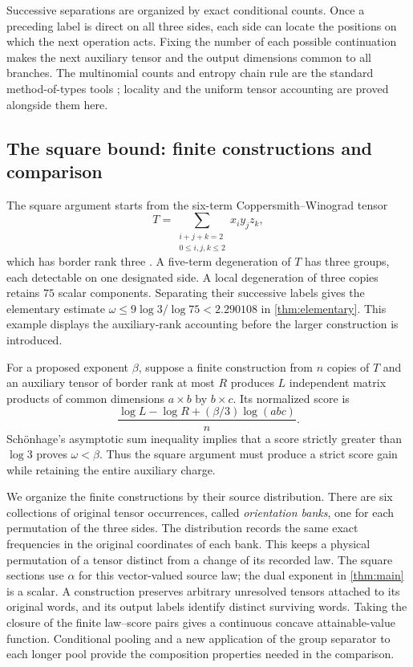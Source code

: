\documentclass[11pt]{article}
\numberwithin{equation}{section}
\theoremstyle{definition}
\theoremstyle{remark}
\begin{document}
Successive separations are organized by exact conditional counts.
Once a preceding label is direct on all three sides, each side can
locate the positions on which the next operation acts.  Fixing the
number of each possible continuation makes the next auxiliary tensor
and the output dimensions common to all branches.  The multinomial
counts and entropy chain rule are the standard method-of-types
tools \cite{shannon1948,csiszar1998}; locality and the uniform tensor
accounting are proved alongside them here.

\subsection{The square bound: finite constructions and comparison}

The square argument starts from the six-term Coppersmith--Winograd
tensor
\[
 T=\sum_{\substack{i+j+k=2\\0\le i,j,k\le2}}x_i y_j z_k,
\]
which has border rank three \cite[Section~7, equation~(10)]{cw}.
A five-term degeneration of \(T\) has three groups, each detectable
on one designated side.  A local degeneration of three copies retains
\(75\) scalar components.  Separating their successive labels gives
the elementary estimate
\(\omega\le9\log3/\log75<2.290108\)
in \cref{thm:elementary}.  This example displays the auxiliary-rank
accounting before the larger construction is introduced.

For a proposed exponent \(\beta\), suppose a finite construction
from \(n\) copies of \(T\) and an auxiliary tensor of border rank
at most \(R\) produces \(L\) independent matrix products of common
dimensions \(a\times b\) by \(b\times c\).  Its normalized score is
\[
 \frac{\log L-\log R+(\beta/3)\log(abc)}{n}.
\]
Sch\"onhage's asymptotic sum inequality implies that a score strictly
greater than \(\log3\) proves \(\omega<\beta\).
Thus the square argument must produce a strict score gain while
retaining the entire auxiliary charge.

We organize the finite constructions by their source distribution.
There are six collections of original tensor occurrences, called
\emph{orientation banks}, one for each permutation of the three
sides.  The distribution records the same exact frequencies in the
original coordinates of each bank.  This keeps a physical permutation
of a tensor distinct from a change of its recorded law.  The square
sections use \(\alpha\) for this vector-valued source law; the dual
exponent in \cref{thm:main} is a scalar.  A construction
preserves arbitrary unresolved tensors attached to its original words,
and its output labels identify distinct surviving words.
Taking the closure of the finite law--score pairs gives a continuous
concave attainable-value function.  Conditional pooling and a new
application of the group separator to each longer pool provide the
composition properties needed in the comparison.
\end{document}
